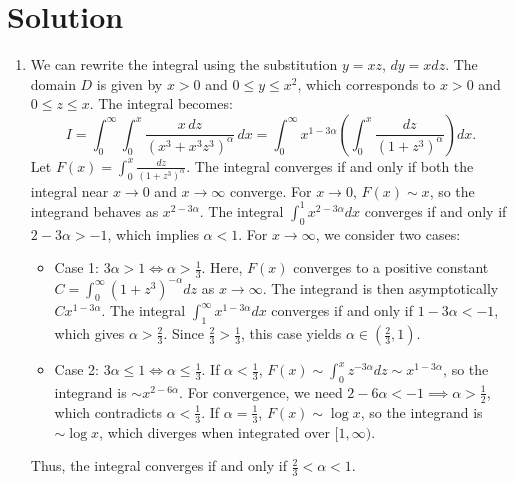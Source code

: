 \documentclass{article}
\begin{document}
\newpage
\section*{Solution}
\begin{enumerate}[label=\fbox{\arabic*}]
  \item %
        We can rewrite the integral using the substitution $y = xz$, $dy = x dz$. The domain $D$ is given by $x > 0$ and $0 \le y \le x^2$, which corresponds to $x > 0$ and $0 \le z \le x$.
        The integral becomes:
        \[
          I = \int_0^\infty \int_0^x \frac{x \, dz}{(x^3 + x^3 z^3)^\alpha} \, dx = \int_0^\infty x^{1-3\alpha} \left( \int_0^x \frac{dz}{(1+z^3)^\alpha} \right) dx.
        \]
        Let $F(x) = \int_0^x \frac{dz}{(1+z^3)^\alpha}$. The integral converges if and only if both the integral near $x \to 0$ and $x \to \infty$ converge.
        For $x \to 0$, $F(x) \sim x$, so the integrand behaves as $x^{2-3\alpha}$. The integral $\int_0^1 x^{2-3\alpha} dx$ converges if and only if $2-3\alpha > -1$, which implies $\alpha < 1$.
        For $x \to \infty$, we consider two cases:
        \begin{itemize}
          \item Case 1: $3\alpha > 1 \iff \alpha > \frac{1}{3}$. Here, $F(x)$ converges to a positive constant $C = \int_0^\infty (1+z^3)^{-\alpha} dz$ as $x \to \infty$. The integrand is then asymptotically $C x^{1-3\alpha}$. The integral $\int_1^\infty x^{1-3\alpha} dx$ converges if and only if $1-3\alpha < -1$, which gives $\alpha > \frac{2}{3}$. Since $\frac{2}{3} > \frac{1}{3}$, this case yields $\alpha \in \left(\frac{2}{3}, 1\right)$.
          \item Case 2: $3\alpha \le 1 \iff \alpha \le \frac{1}{3}$. If $\alpha < \frac{1}{3}$, $F(x) \sim \int_0^x z^{-3\alpha} dz \sim x^{1-3\alpha}$, so the integrand is $\sim x^{2-6\alpha}$. For convergence, we need $2-6\alpha < -1 \implies \alpha > \frac{1}{2}$, which contradicts $\alpha < \frac{1}{3}$. If $\alpha = \frac{1}{3}$, $F(x) \sim \log x$, so the integrand is $\sim \log x$, which diverges when integrated over $[1, \infty)$.
        \end{itemize}
        Thus, the integral converges if and only if $\frac{2}{3} < \alpha < 1$.


\end{enumerate}
\end{document}
